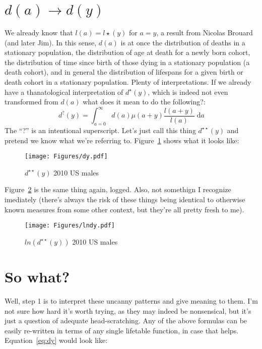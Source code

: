 \documentclass{article}
\newcommand{\dd}{\; \mathrm{d}}
\begin{document}
\section{$d(a) \rightarrow d(y)$}
We already know that $l(a) = l\star(y)$ for $a=y$, a result from Nicolas Brouard
(and later Jim). In this sense, $d(a)$ is at once the distribution of deaths in
a stationary population, the distribution of age at death for a newly born
cohort, the distribution of time since birth of those dying in a stationary
population (a death cohort), and in general the distribution of lifespans for a
given birth or death cohort in a stationary population. Plenty of
interpretations. If we already have a thanatological interpretation of
$d^\star(y)$, which is indeed not even transformed from $d(a)$ what does it mean
to do the following?:
\begin{equation}
\label{eq:dy}
d^{?}(y) = \int _{a=0}^\infty d(a)\mu(a+y)\frac{l(a+y)}{l(a)} \dd a
\end{equation}
The ``?'' is an intentional superscript. Let's just call this
thing $d^{\star\star}(y)$ and pretend we know what we're referring to.
Figure~\ref{fig:dy} shows what it looks like:

\begin{figure}[ht!]
\caption{$d^{\star\star}(y)$ 2010 US males}
\label{fig:dy}
\texttt{[image: Figures/dy.pdf]}
\end{figure}

Figure~\ref{fig:lndy} is the same thing again, logged. Also, not somethign I
recognize imediately (there's always the risk of these things being identical
to otherwise known measures from some other context, but they're all pretty
fresh to me).

\begin{figure}[ht!]
\caption{$ln(d^{\star\star}(y))$ 2010 US males}
\label{fig:lndy}
\texttt{[image: Figures/lndy.pdf]}
\end{figure}

\FloatBarrier

\section{So what?}
Well, step 1 is to interpret these uncanny patterns and give meaning to them.
I'm not sure how hard it's worth trying, as they may indeed be nonsensical, but
it's just a question of adequate head-scratching. Any of the above formulas can
be easily re-written in terms of any single lifetable function, in case that
helps. Equation~\eqref{eq:dy} would look like:
\end{document}
